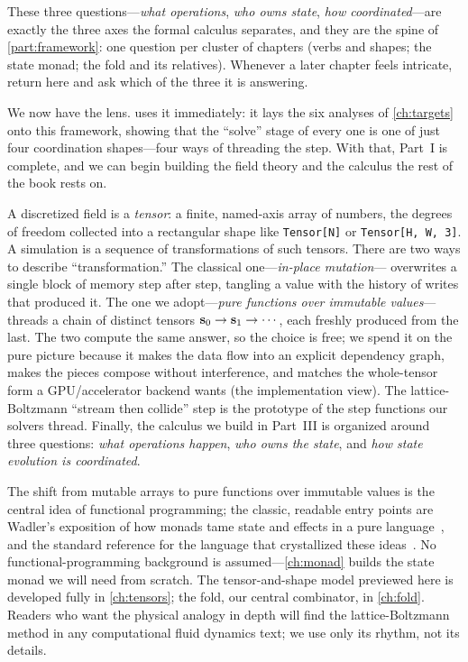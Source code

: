 \begin{notationbox}
These three questions---\emph{what operations}, \emph{who owns state}, \emph{how
coordinated}---are exactly the three axes the formal calculus separates, and they
are the spine of \cref{part:framework}: one question per cluster of chapters
(verbs and shapes; the state monad; the fold and its relatives). Whenever a later
chapter feels intricate, return here and ask which of the three it is answering.
\end{notationbox}

We now have the lens.  uses it immediately: it lays the six
analyses of \cref{ch:targets} onto this framework, showing that the ``solve''
stage of every one is one of just four coordination shapes---four ways of
threading the step. With that, Part~I is complete, and we can begin building the
field theory and the calculus the rest of the book rests on.

\summarysection
A discretized field is a \emph{tensor}: a finite, named-axis array of numbers, the
degrees of freedom collected into a rectangular shape like
\lstinline[style=l4style]|Tensor[N]| or \lstinline[style=l4style]|Tensor[H, W, 3]|.
A simulation is a sequence of transformations of such tensors. There are two ways
to describe ``transformation.'' The classical one---\emph{in-place mutation}---
overwrites a single block of memory step after step, tangling a value with the
history of writes that produced it. The one we adopt---\emph{pure functions over
immutable values}---threads a chain of distinct tensors $\mathbf{s}_0 \to \mathbf{s}_1 \to
\cdots$, each freshly produced from the last. The two compute the same answer, so
the choice is free; we spend it on the pure picture because it makes the data flow
into an explicit dependency graph, makes the pieces compose without interference,
and matches the whole-tensor form a GPU/accelerator backend wants (the
implementation view). The lattice-Boltzmann ``stream then collide'' step is the
prototype of the step functions our solvers thread. Finally, the calculus we build
in Part~III is organized around three questions: \emph{what operations happen},
\emph{who owns the state}, and \emph{how state evolution is coordinated}.

\furtherreading
The shift from mutable arrays to pure functions over immutable values is the
central idea of functional programming; the classic, readable entry points are
Wadler's exposition of how monads tame state and effects in a pure
language~\citep{wadler1995monads}, and the standard reference for the language
that crystallized these ideas~\citep{peytonjones2003}. No functional-programming
background is assumed---\cref{ch:monad} builds the state monad we will need from
scratch. The tensor-and-shape model previewed here is developed fully in
\cref{ch:tensors}; the fold, our central combinator, in \cref{ch:fold}. Readers
who want the physical analogy in depth will find the lattice-Boltzmann method in
any computational fluid dynamics text; we use only its rhythm, not its details.

